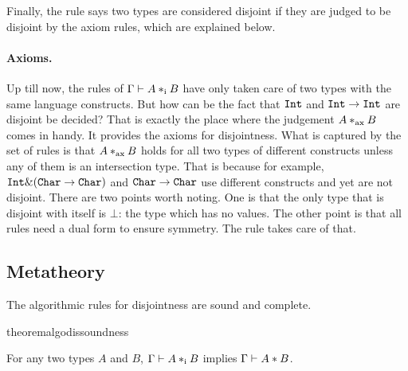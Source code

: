 Finally, the rule  says two types are considered disjoint if they are
judged to be disjoint by the axiom rules, which are explained below.

\paragraph{Axioms.} Up till now, the rules of $ \Gamma \vdash A *_\textnormal{i} B $ have only
taken care of two types with the same language constructs. But how can be the fact that
$\texttt{Int}$ and $\texttt{Int} \to \texttt{Int}$ are disjoint be decided? That is exactly the
place where the judgement $ A *_\textnormal{ax} B $ comes in handy. It provides the
axioms for disjointness. What is captured by the set of rules is that $ A
*_\textnormal{ax} B $ holds for all two types of different constructs unless any of
them is an intersection type. That is because for example, $ \texttt{Int} \&
(\texttt{Char} \to \texttt{Char}) $ and $ \texttt{Char} \to \texttt{Char} $ use different constructs
and yet are not disjoint. There are two points worth noting. One is
that the only type that is disjoint with itself is $\bot$: the type
which has no values. The other point is that all rules need a dual
form to ensure symmetry. The rule  takes care of that.

\subsection{Metatheory}

The algorithmic rules for disjointness are sound and complete.

%
%

\begin{restatable}{theorem}{algodissoundness}
  \label{theorem:soundness}

  For any two types $A$ and $B$, $\Gamma \vdash A *_\textnormal{i} B$ implies $\Gamma \vdash A * B$.
\end{restatable}

